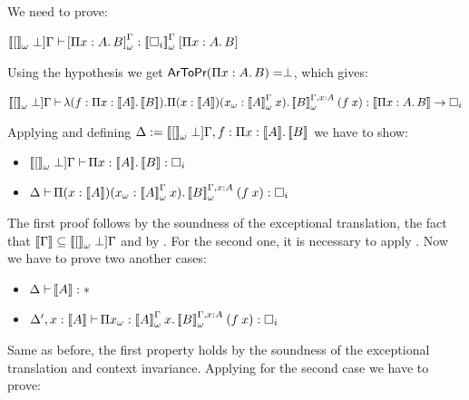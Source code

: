\begin{Proof}
\begin{ProofCase}{\CicPropProd}
We need to prove:
\begin{center}
$\ctyping[][\WContextTrans[\False]{\Context}]{%
           \WParamTrans{\depArrow{x}{A}{B}}}{%
           \app{\WParamTypeTrans{\Type}}{\Trans{\depArrow{x}{A}{B}}}}
$
\end{center}
Using the hypothesis we get $\propFun[\depArrow{x}{A}{B}]\termEq\False$, which gives:
\begin{center}
$\ctyping[][\WContextTrans[\False]{\Context}]{%
           \varabs{f}{\depArrow{x}{\TypeTrans{A}}{\TypeTrans{B}}}{%
                  \depArrow{x}{\TypeTrans{A}}{\WTermTrans{x}}{\app{\WParamTypeTrans{A}}{x}}{
                            \app{\WParamTypeTrans[\Context,\typing{x}{A}]{B}}{(\app{f}{x})}}}}{%
           \arrow{\TypeTrans{\depArrow{x}{A}{B}}}{\Type}}
$    
\end{center}
Applying \CicAbs{} and defining
$\varContext\termDef\WContextTrans[\False]{\Context},\typing{f}{\depArrow{x}{\TypeTrans{A}}{\TypeTrans{B}}}$
we have to show:
\begin{itemize}
\item $\ctyping[][\WContextTrans[\False]{\Context}]{\depArrow{x}{\TypeTrans{A}}{\TypeTrans{B}}}{\Type}$
\item $\ctyping[][\varContext]{\depArrow{x}{\TypeTrans{A}}{\WTermTrans{x}}{\app{\WParamTypeTrans{A}}{x}}{
                                       \app{\WParamTypeTrans[\Context,\typing{x}{A}]{B}}{(\app{f}{x})}}}{
                             \Type}$
\end{itemize}
The first proof follows by the soundness of the exceptional translation, the fact that 
$\TypeTrans{\Context} \subseteq \WContextTrans[\False]{\Context}$ and by 
. For the second one, it is necessary to apply
\CicPropProd{}. Now we have to prove two another cases:
\begin{itemize}
\item $\ctyping[][\varContext]{\TypeTrans{A}}{\Prop}$
\item $\ctyping[][\varContext',\typing{x}{\TypeTrans{A}}]{
                  \depArrow{\WTermTrans{x}}{\app{\WParamTypeTrans{A}}{x}}{
                            \app{\WParamTypeTrans[\Context,\typing{x}{A}]{B}}{(\app{f}{x})}}}{
                  \Type}$
\end{itemize}
Same as before, the first property holds by the soundness of the exceptional translation and 
context invariance. Applying \CicTypeProd{} for the second case
we have to prove:

\end{ProofCase}
\end{Proof}
